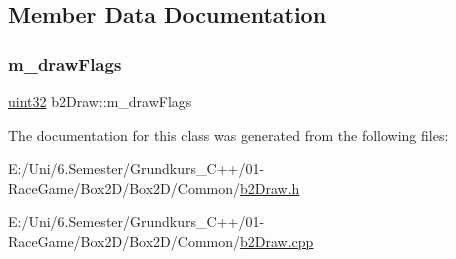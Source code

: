 \subsection{Member Data Documentation}
\mbox{\label{classb2_draw_adfcd2e54ddaec6f0a111ec1a1cf8b9a0}} 
\subsubsection{\texorpdfstring{m\_drawFlags}{m\_drawFlags}}
{\footnotesize\ttfamily \mbox{\hyperlink{b2_settings_8h_a1134b580f8da4de94ca6b1de4d37975e}{uint32}} b2\+Draw\+::m\+\_\+draw\+Flags\hspace{0.3cm}{\ttfamily [protected]}}



The documentation for this class was generated from the following files\+:\begin{DoxyCompactItemize}
\item 
E\+:/\+Uni/6.\+Semester/\+Grundkurs\+\_\+\+C++/01-\/\+Race\+Game/\+Box2\+D/\+Box2\+D/\+Common/\mbox{\hyperlink{b2_draw_8h}{b2\+Draw.\+h}}\item 
E\+:/\+Uni/6.\+Semester/\+Grundkurs\+\_\+\+C++/01-\/\+Race\+Game/\+Box2\+D/\+Box2\+D/\+Common/\mbox{\hyperlink{b2_draw_8cpp}{b2\+Draw.\+cpp}}\end{DoxyCompactItemize}

